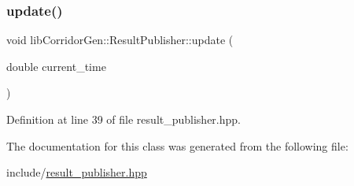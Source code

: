 \mbox{\label{classlib_corridor_gen_1_1_result_publisher_ac44b00acc1fbb46fb1b0ba1473b32145}} 
\subsubsection{\texorpdfstring{update()}{update()}}
{\footnotesize\ttfamily void lib\+Corridor\+Gen\+::\+Result\+Publisher\+::update (\begin{DoxyParamCaption}\item[{double}]{current\+\_\+time }\end{DoxyParamCaption})\hspace{0.3cm}{\ttfamily [inline]}}



Definition at line 39 of file result\+\_\+publisher.\+hpp.



The documentation for this class was generated from the following file\+:\begin{DoxyCompactItemize}
\item 
include/\hyperlink{result__publisher_8hpp}{result\+\_\+publisher.\+hpp}\end{DoxyCompactItemize}
